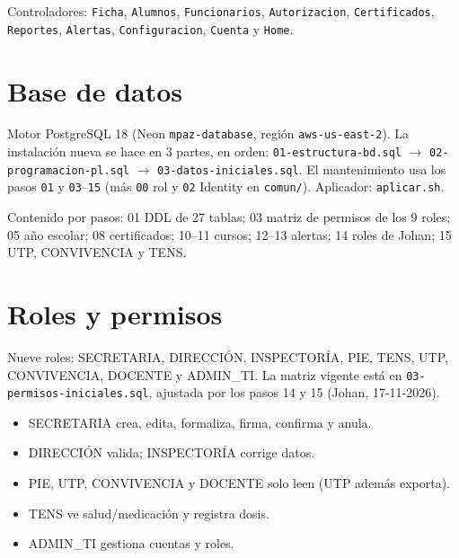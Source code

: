 \documentclass[11pt,a4paper]{article}
\newcommand{\codigo}[1]{\texttt{\color{mpazAzul}#1}}
\begin{document}
Controladores: \codigo{Ficha}, \codigo{Alumnos}, \codigo{Funcionarios},
\codigo{Autorizacion}, \codigo{Certificados}, \codigo{Reportes},
\codigo{Alertas}, \codigo{Configuracion}, \codigo{Cuenta} y \codigo{Home}.

\section{Base de datos}
Motor PostgreSQL 18 (Neon \codigo{mpaz-database}, región
\codigo{aws-us-east-2}). La instalación nueva se hace en 3 partes, en orden:
\codigo{01-estructura-bd.sql} $\rightarrow$
\codigo{02-programacion-pl.sql} $\rightarrow$
\codigo{03-datos-iniciales.sql}. El mantenimiento usa los pasos \codigo{01} y
\codigo{03}--\codigo{15} (más \codigo{00} rol y \codigo{02} Identity en
\codigo{comun/}). Aplicador: \codigo{aplicar.sh}.

Contenido por pasos: 01 DDL de 27 tablas; 03 matriz de permisos de los 9
roles; 05 año escolar; 08 certificados; 10--11 cursos; 12--13 alertas;
14 roles de Johan; 15 UTP, CONVIVENCIA y TENS.

\section{Roles y permisos}
Nueve roles: SECRETARIA, DIRECCIÓN, INSPECTORÍA, PIE, TENS, UTP, CONVIVENCIA,
DOCENTE y ADMIN\_TI. La matriz vigente está en
\codigo{03-permisos-iniciales.sql}, ajustada por los pasos 14 y 15 (Johan,
17-11-2026).

\begin{itemize}[leftmargin=*,itemsep=0.15em]
\item SECRETARIA crea, edita, formaliza, firma, confirma y anula.
\item DIRECCIÓN valida; INSPECTORÍA corrige datos.
\item PIE, UTP, CONVIVENCIA y DOCENTE solo leen (UTP además exporta).
\item TENS ve salud/medicación y registra dosis.
\item ADMIN\_TI gestiona cuentas y roles.
\end{itemize}
\end{document}

